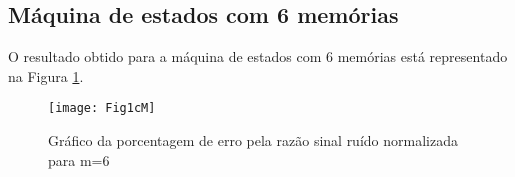 \subsection{Máquina de estados com 6 memórias}

O resultado obtido para a máquina de estados com 6 memórias está representado na Figura \ref{fig:Fig1cM}.

\begin{figure}[H]
	\centering
	\texttt{[image: Fig1cM]}
	\captionsetup{font=scriptsize}
	\caption{Gráfico da porcentagem de erro pela razão sinal ruído normalizada para m=6\label{fig:Fig1cM}}
\end{figure}